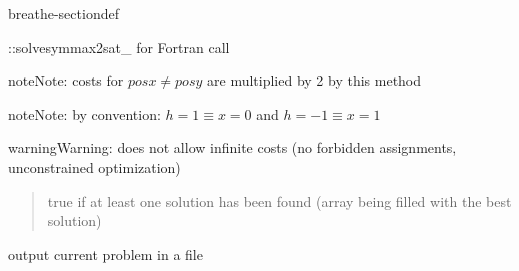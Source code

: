 \documentclass[letterpaper,10pt,openany,oneside,english]{sphinxmanual}
\begin{document}
\begin{fulllineitems}
\begin{sphinxuseclass}{breathe-sectiondef}
\begin{fulllineitems}
\sphinxAtStartPar


\nopagebreak


\sphinxAtStartPar
::solvesymmax2sat\_ for Fortran call 




\begin{sphinxadmonition}{note}{Note:}
\sphinxAtStartPar
costs for \(posx \neq posy\) are multiplied by 2 by this method 
\end{sphinxadmonition}

\begin{sphinxadmonition}{note}{Note:}
\sphinxAtStartPar
by convention: \(h = 1 \equiv x = 0\) and \(h = -1 \equiv x = 1\) 
\end{sphinxadmonition}

\begin{sphinxadmonition}{warning}{Warning:}
\sphinxAtStartPar
does not allow infinite costs (no forbidden assignments, unconstrained optimization) 
\end{sphinxadmonition}
\begin{quote}\begin{description}
\sphinxAtStartPar
true if at least one solution has been found (array  being filled with the best solution) 

\end{description}\end{quote}

\end{fulllineitems}


\begin{fulllineitems}
\label{\detokenize{ref/ref_cpp:_CPPv4N17WeightedCSPSolver9dump_wcspEPKcb13ProblemFormat}}\label{\detokenize{ref/ref_cpp:_CPPv3N17WeightedCSPSolver9dump_wcspEPKcb13ProblemFormat}}\label{\detokenize{ref/ref_cpp:_CPPv2N17WeightedCSPSolver9dump_wcspEPKcb13ProblemFormat}}\label{\detokenize{ref/ref_cpp:WeightedCSPSolver::dump_wcsp__cCP.b.ProblemFormat}}
\pysigstartsignatures
\pysigstartmultiline
{}
\pysigstopmultiline
\pysigstopsignatures
\sphinxAtStartPar
output current problem in a file 


\end{fulllineitems}
\end{sphinxuseclass}
\end{fulllineitems}
\end{document}
